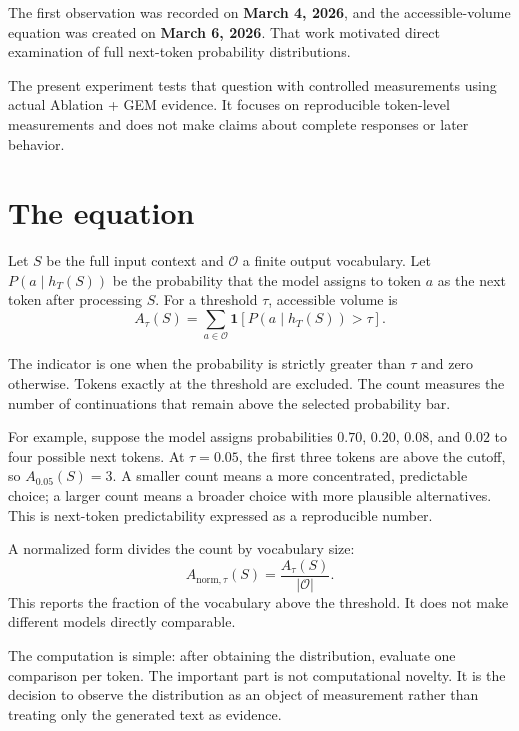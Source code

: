 \documentclass[11pt,a4paper]{article}
\begin{document}
The first observation was recorded on \textbf{March 4, 2026}, and the accessible-volume equation was created on \textbf{March 6, 2026}. That work motivated direct examination of full next-token probability distributions.

The present experiment tests that question with controlled measurements using actual Ablation + GEM evidence. It focuses on reproducible token-level measurements and does not make claims about complete responses or later behavior.

\section{The equation}
Let $S$ be the full input context and $\mathcal{O}$ a finite output vocabulary. Let $P(a\mid h_T(S))$ be the probability that the model assigns to token $a$ as the next token after processing $S$. For a threshold $\tau$, accessible volume is
\begin{equation}
A_\tau(S)=\sum_{a\in\mathcal{O}}\mathbf{1}\!\left[P(a\mid h_T(S))>\tau\right].
\label{eq:accessible-volume}
\end{equation}

The indicator is one when the probability is strictly greater than $\tau$ and zero otherwise. Tokens exactly at the threshold are excluded. The count measures the number of continuations that remain above the selected probability bar.

For example, suppose the model assigns probabilities $0.70$, $0.20$, $0.08$, and $0.02$ to four possible next tokens. At $\tau=0.05$, the first three tokens are above the cutoff, so $A_{0.05}(S)=3$. A smaller count means a more concentrated, predictable choice; a larger count means a broader choice with more plausible alternatives. This is next-token predictability expressed as a reproducible number.

A normalized form divides the count by vocabulary size:
\begin{equation}
A_{\mathrm{norm},\tau}(S)=\frac{A_\tau(S)}{|\mathcal{O}|}.
\end{equation}
This reports the fraction of the vocabulary above the threshold. It does not make different models directly comparable.

The computation is simple: after obtaining the distribution, evaluate one comparison per token. The important part is not computational novelty. It is the decision to observe the distribution as an object of measurement rather than treating only the generated text as evidence.
\end{document}
